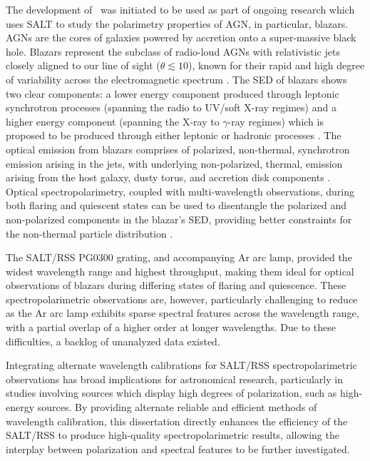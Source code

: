 The development of \stops\ was initiated to be used as part of ongoing research which uses SALT to study the polarimetry properties of AGN, in particular, blazars.
\glspl{AGN} are the cores of galaxies powered by accretion onto a super-massive black hole.
Blazars represent the subclass of radio-loud \glspl{AGN} with relativistic jets closely aligned to our line of sight ($\theta \lesssim 10$\degree), known for their rapid and high degree of variability across the electromagnetic spectrum \citep{Urry_1995}.
The \gls{SED} of blazars shows two clear components:
a lower energy component produced through leptonic synchrotron processes (spanning the radio to \gls{UV}/soft X-ray regimes)
and a higher energy component (spanning the X-ray to $\gamma$-ray regimes) which is proposed to be produced through either leptonic or hadronic processes \citep{Bottcher_2013}.
%
The optical emission from blazars comprises of polarized, non-thermal, synchrotron emission arising in the jets, with underlying non-polarized, thermal, emission arising from the host galaxy, dusty torus, and accretion disk components  \citep{Ghisellini_2009}.
Optical spectropolarimetry, coupled with multi-wavelength observations, during both flaring and quiescent states can be used to disentangle the polarized and non-polarized components in the blazar's \gls{SED}, providing better constraints for the non-thermal particle distribution \citep{Schutte_COSPAR, Schutte4C0102}.

The \gls{SALT}/\gls{RSS} PG$0300$ grating, and accompanying \gls{Ar} arc lamp, provided the widest wavelength range and highest throughput, making them ideal for optical observations of blazars during differing states of flaring and quiescence.
These spectro\-polarimetric observations are, however, particularly challenging to reduce as the \gls{Ar} arc lamp exhibits sparse spectral features across the wavelength range, with a partial overlap of a higher order at longer wavelengths.
Due to these difficulties, a backlog of unanalyzed data existed.



Integrating alternate wavelength calibrations for \gls{SALT}/\gls{RSS} spectro\-polarimetric observations has broad implications for astronomical research, particularly in studies involving sources which display high degrees of polarization, such as high-energy sources.
By providing alternate reliable and efficient methods of wavelength calibration, this dissertation directly enhances the efficiency of the \gls{SALT}/\gls{RSS} to produce high-quality spectropolarimetric results, allowing the interplay between polarization and spectral features to be further investigated.

